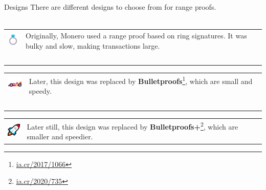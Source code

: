 \documentclass[aspectratio=169]{beamer}
\begin{document}
\begin{frame}{Designs}
    There are different designs to choose from for range proofs. \\~\\

    \begin{tabular}{>{\arraybackslash}m{40px} >{\arraybackslash}m{320px}}
        \includegraphics[width=30px]{images/ring.png} & Originally, Monero used a range proof based on ring signatures.
        It was bulky and slow, making transactions large. \\~\\
    \end{tabular}

    \begin{tabular}{>{\arraybackslash}m{40px} >{\arraybackslash}m{320px}}
        \includegraphics[width=30px]{images/racecar.png} & Later, this design was replaced by \textbf{Bulletproofs}\footnote{\url{ia.cr/2017/1066}}, which are small and speedy. \\~\\
    \end{tabular}

    \begin{tabular}{>{\arraybackslash}m{40px} >{\arraybackslash}m{320px}}
        \includegraphics[width=30px]{images/rocket.png} & Later still, this design was replaced by \textbf{Bulletproofs+}\footnote{\url{ia.cr/2020/735}}, which are smaller and speedier.
    \end{tabular}
\end{frame}
\end{document}
